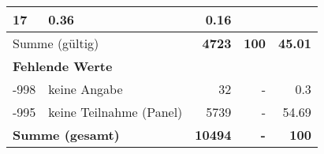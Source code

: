 \begin{longtable}{lXrrr}
       \num{17} &
       \num[round-mode=places,round-precision=2]{0.36} &
         \num[round-mode=places,round-precision=2]{0.16} \\
     \midrule
     \multicolumn{2}{l}{Summe (gültig)} &
       \textbf{\num{4723}} &
     \textbf{\num{100}} &
       \textbf{\num[round-mode=places,round-precision=2]{45.01}} \\
     \multicolumn{5}{l}{\textbf{Fehlende Werte}}\\
       -998 &
       keine Angabe &
         \num{32} &
        - &
         \num[round-mode=places,round-precision=2]{0.3} \\
       -995 &
       keine Teilnahme (Panel) &
         \num{5739} &
        - &
         \num[round-mode=places,round-precision=2]{54.69} \\
     \midrule
     \multicolumn{2}{l}{\textbf{Summe (gesamt)}} &
          \textbf{\num{10494}} &
        \textbf{-} &
        \textbf{\num{100}} \\
     \bottomrule
     \end{longtable}
     

